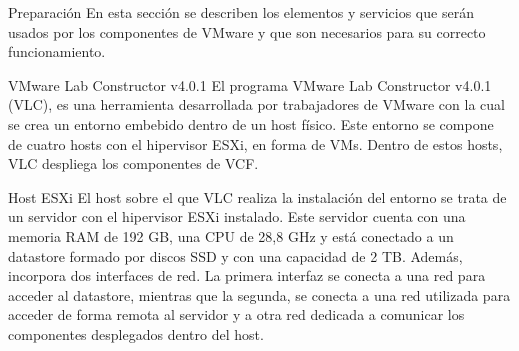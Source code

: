 \begin{subsection}{Preparación}
  En esta sección se describen los elementos y servicios que serán usados por los componentes de VMware y que son necesarios para su correcto funcionamiento.

  \begin{subsubsection}{VMware Lab Constructor v4.0.1}
    El programa VMware Lab Constructor v4.0.1 (VLC), es una herramienta desarrollada por trabajadores de VMware con la cual se crea un entorno embebido dentro de un host físico. Este entorno se compone de cuatro hosts con el hipervisor ESXi, en forma de VMs. Dentro de estos hosts, VLC despliega los componentes de VCF.

  \end{subsubsection}

  \begin{subsubsection}{Host ESXi}  
    El host sobre el que VLC realiza la instalación del entorno se trata de un servidor con el hipervisor ESXi instalado. Este servidor cuenta con una memoria RAM de 192 GB, una CPU de 28,8 GHz y está conectado a un datastore formado por discos SSD y con una capacidad de 2 TB. Además, incorpora dos interfaces de red. La primera interfaz se conecta a una red para acceder al datastore, mientras que la segunda, se conecta a una red utilizada para acceder de forma remota al servidor y a otra red dedicada a comunicar los componentes desplegados dentro del host.

  \end{subsubsection}


\end{subsection}

